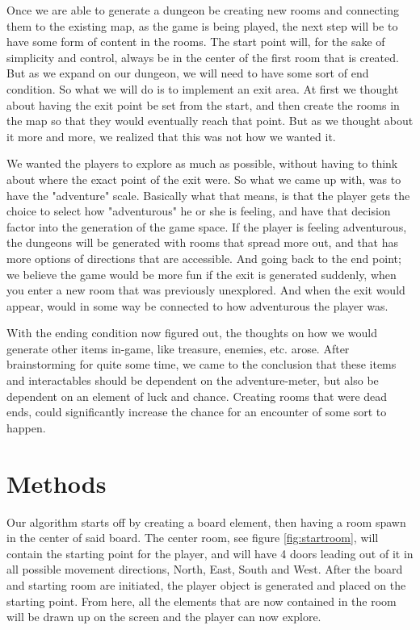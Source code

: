\documentclass[conference,compsoc]{IEEEtran}
\begin{document}
Once we are able to generate a dungeon be creating new rooms and connecting them to the existing map, as the game is being played, the next step will be to have some form of content in the rooms.
The start point will, for the sake of simplicity and control, always be in the center of the first room that is created. But as we expand on our dungeon, we will need to have some sort of end condition. So what we will do is to implement an exit area. At first we thought about having the exit point be set from the start, and then create the rooms in the map so that they would eventually reach that point. But as we thought about it more and more, we realized that this was not how we wanted it. 

We wanted the players to explore as much as possible, without having to think about where the exact point of the exit were. So what we came up with, was to have the "adventure" scale. Basically what that means, is that the player gets the choice to select how "adventurous" he or she is feeling, and have that decision factor into the generation of the game space. If the player is feeling adventurous, the dungeons will be generated with rooms that spread more out, and that has more options of directions that are accessible. And going back to the end point; we believe the game would be more fun if the exit is generated suddenly, when you enter a new room that was previously unexplored. And when the exit would appear, would in some way be connected to how adventurous the player was.

With the ending condition now figured out, the thoughts on how we would generate other items in-game, like treasure, enemies, etc. arose. After brainstorming for quite some time, we came to the conclusion that these items and interactables should be dependent on the adventure-meter, but also be dependent on an element of luck and chance.
Creating rooms that were dead ends, could significantly increase the chance for an encounter of some sort to happen.

\section{Methods}
Our algorithm starts off by creating a board element, then having a room spawn in the center of said board. The center room, see figure \ref{fig:startroom}, will contain the starting point for the player, and will have 4 doors leading out of it in all possible movement directions, North, East, South and West.
After the board and starting room are initiated, the player object is generated and placed on the starting point. From here, all the elements that are now contained in the room will be drawn up on the screen and the player can now explore.
\end{document}
